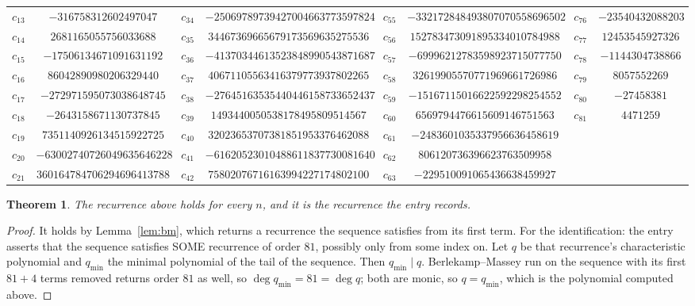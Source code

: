 \documentclass[11pt,a4paper]{article}
\theoremstyle{plain}
\newtheorem{theorem}{Theorem}
\theoremstyle{definition}
\begin{document}
\begin{center}
\begin{tabular}{cccccccc}
$c_{13}$ & $-316758312602497047$ & $c_{34}$ & $-25069789739427004663773597824$ & $c_{55}$ & $-332172848493807070558696502$ & $c_{76}$ & $-23540432088203$ \\
$c_{14}$ & $2681165055756033688$ & $c_{35}$ & $34467369665679173569635275536$ & $c_{56}$ & $152783473091895334010784988$ & $c_{77}$ & $12453545927326$ \\
$c_{15}$ & $-17506134671091631192$ & $c_{36}$ & $-41370344613523848990543871687$ & $c_{57}$ & $-69996212783598923715077750$ & $c_{78}$ & $-1144304738866$ \\
$c_{16}$ & $86042890980206329440$ & $c_{37}$ & $40671105563416379773937802265$ & $c_{58}$ & $32619905570771969661726986$ & $c_{79}$ & $8057552269$ \\
$c_{17}$ & $-272971595073038648745$ & $c_{38}$ & $-27645163535440446158733652437$ & $c_{59}$ & $-15167115016622592298254552$ & $c_{80}$ & $-27458381$ \\
$c_{18}$ & $-2643158671130737845$ & $c_{39}$ & $1493440050538178495809514567$ & $c_{60}$ & $6569794476615609146751563$ & $c_{81}$ & $4471259$ \\
$c_{19}$ & $7351140926134515922725$ & $c_{40}$ & $32023653707381851953376462088$ & $c_{61}$ & $-2483601035337956636458619$ &  &  \\
$c_{20}$ & $-63002740726049635646228$ & $c_{41}$ & $-61620523010488611837730081640$ & $c_{62}$ & $806120736396623763509958$ &  &  \\
$c_{21}$ & $360164784706294696413788$ & $c_{42}$ & $75802076716163994227174802100$ & $c_{63}$ & $-229510091065436638459927$ &  &  \\
\end{tabular}
\end{center}

\begin{theorem}
The recurrence above holds for every $n$, and it is the recurrence the entry records.
\end{theorem}

\begin{proof}
It holds by Lemma~\ref{lem:bm}, which returns a recurrence the sequence satisfies from its
first term. For the identification: the entry asserts that the sequence satisfies SOME
recurrence of order $81$, possibly only from some index on. Let $q$ be that recurrence's
characteristic polynomial and $q_{\min}$ the minimal polynomial of the tail of the sequence.
Then $q_{\min}\mid q$. Berlekamp--Massey run on the sequence with its first $81+4$ terms
removed returns order $81$ as well, so $\deg q_{\min}=81=\deg q$; both are monic, so
$q=q_{\min}$, which is the polynomial computed above.
\end{proof}
\end{document}

